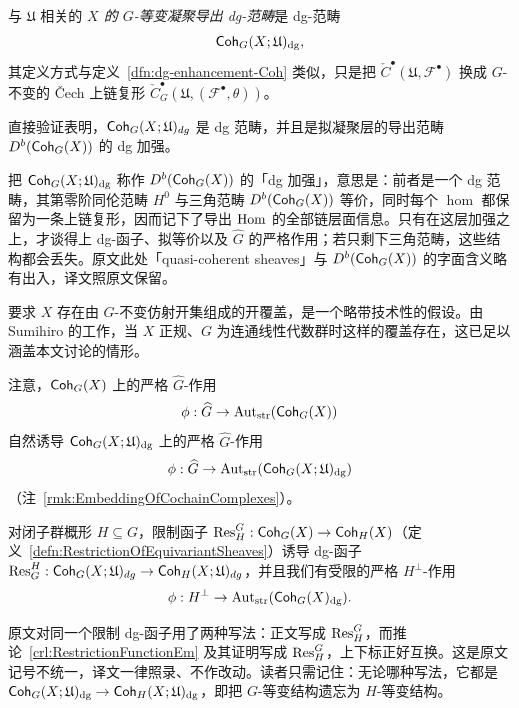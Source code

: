 \begin{dfn}\label{dfn:GEquivQCohdg}
与 $\mathfrak{U}$ 相关的 \emph{$X$ 的 $G$-等变凝聚导出 dg-范畴}是 dg-范畴
$$
\Coh_G(X;\mathfrak{U})_{\dg},
$$
其定义方式与定义~\ref{dfn:dg-enhancement-Coh} 类似，只是把 $\check{C}^{\bullet}(\mathfrak{U},\mathcal{F}^{\bullet})$ 换成 $G$-不变的 \v{C}ech 上链复形 $\check{C}^{\bullet}_G(\mathfrak{U},(\mathcal{F}^{\bullet},\theta))$。
\end{dfn}

直接验证表明，$\Coh_G(X;\mathfrak{U})_{dg}$ 是 dg 范畴，并且是拟凝聚层的导出范畴 $D^b(\Coh_G(X))$ 的 dg 加强。

\begin{yizhu}[dg 加强到底加强了什么]
把 $\Coh_G(X;\mathfrak{U})_{\dg}$ 称作 $D^b(\Coh_G(X))$ 的「dg 加强」，意思是：前者是一个 dg 范畴，其第零阶同伦范畴 $H^0$ 与三角范畴 $D^b(\Coh_G(X))$ 等价，同时每个 $\hom$ 都保留为一条上链复形，因而记下了导出 $\Hom$ 的全部链层面信息。只有在这层加强之上，才谈得上 dg-函子、拟等价以及 $\widehat{G}$ 的严格作用；若只剩下三角范畴，这些结构都会丢失。原文此处「quasi-coherent sheaves」与 $D^b(\Coh_G(X))$ 的字面含义略有出入，译文照原文保留。
\end{yizhu}

\begin{rmk}
要求 $X$ 存在由 $G$-不变仿射开集组成的开覆盖，是一个略带技术性的假设。由 Sumihiro \cite{Sumihiro74} 的工作，当 $X$ 正规、$G$ 为连通线性代数群时这样的覆盖存在，这已足以涵盖本文讨论的情形。
\end{rmk}

注意，$\Coh_G(X)$ 上的严格 $\widehat{G}$-作用
$$
\phi:\widehat{G}\rightarrow\Aut_{\str}(\Coh_G(X))
$$
自然诱导 $\Coh_G(X;\mathfrak{U})_{\dg}$ 上的严格 $\widehat{G}$-作用
$$
\phi:\widehat{G}\rightarrow\Aut_{\str}(\Coh_G(X;\mathfrak{U})_{\dg})
$$
（注~\ref{rmk:EmbeddingOfCochainComplexes}）。

对闭子群概形 $H\subseteq G$，限制函子 $\Res^G_H:\Coh_G(X)\rightarrow\Coh_H(X)$（定义~\ref{defn:RestrictionOfEquivariantSheaves}）诱导 dg-函子 $\Res_G^H:\Coh_G(X;\mathfrak{U})_{dg}\rightarrow\Coh_H(X;\mathfrak{U})_{dg}$，并且我们有受限的严格 $H^\perp$-作用
$$
\phi:H^\perp\rightarrow\Aut_{\str}(\Coh_G(X)_{\dg}).
$$

\begin{yizhu}[限制函子的记号方向]
原文对同一个限制 dg-函子用了两种写法：正文写成 $\Res^G_H$，而推论~\ref{crl:RestrictionFunctionEm} 及其证明写成 $\Res_H^G$，上下标正好互换。这是原文记号不统一，译文一律照录、不作改动。读者只需记住：无论哪种写法，它都是 $\Coh_G(X;\mathfrak{U})_{\dg}\rightarrow\Coh_H(X;\mathfrak{U})_{\dg}$，即把 $G$-等变结构遗忘为 $H$-等变结构。
\end{yizhu}

